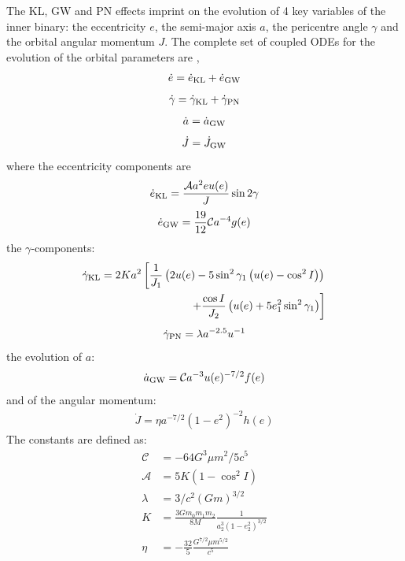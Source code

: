\documentclass[a4paper,fleqn,usenatbib]{mnras}
\begin{document}
\noindent The KL, GW and PN effects imprint on the evolution of 4 key variables of the inner binary: the eccentricity $e$, the semi-major axis $a$, the pericentre angle $\gamma$ and the orbital angular momentum $J$. The complete set of coupled ODEs for the evolution of the orbital parameters are \citep{Randall2018},
\begin{eqnarray}
\dot{e} = \dot{e}_{\rm KL} + \dot{e}_{\rm GW}
\label{eq:edot}
\end{eqnarray}
\begin{eqnarray}
\dot{\gamma} = \dot{\gamma}_{\rm KL} + \dot{\gamma}_{\rm PN}
\label{eq:gdot}
\end{eqnarray}
\begin{eqnarray}
\dot{a} = \dot{a}_{\rm GW} 
\label{eq:gwdot}
\end{eqnarray}
\begin{eqnarray}
\dot{J} = \dot{J}_{\rm GW} 
\label{eq:Jdot}
\end{eqnarray}
where the eccentricity components are
\begin{eqnarray}
\dot{e}_{\rm KL} =   \frac{\mathcal{A} a^2 e u(e)}{J}  \sin 2 \gamma
\end{eqnarray}
\begin{eqnarray}
\dot{e}_{\rm GW} = \frac{19}{12} \mathcal{C} a^{-4} g(e)
\end{eqnarray}
the $\gamma$-components:
\begin{align}
\dot{\gamma}_{\rm KL} = 2 Ka^2\left[\frac{1}{J_{1}}\left(2u(e)-5 \sin ^{2} \gamma_{1}\left(u(e)-\cos ^{2} I\right) \right)\right. \\
\left.+\frac{\cos I}{J_{2}}\left(u(e)+5 e_{1}^{2} \sin ^{2} \gamma_{1}\right) \right]
\end{align}
\begin{eqnarray}
\dot{\gamma}_{\rm PN} = \lambda a^{-2.5} u^{-1 }
\end{eqnarray}
the evolution of $a$:
\begin{eqnarray}
\dot{a}_{\rm GW} = \mathcal{C} a^{-3} u(e)^{-7/2} f(e)
\label{eq:adot_spec}
\end{eqnarray}
and of the angular momentum:
\begin{eqnarray}
\dot{J} = \eta a^{-7/2} (1-e^2)^{-2} h(e)
\end{eqnarray}
The constants are defined as:
\begin{align}
\mathcal{C} &= -64 G^{3} \mu m^{2} / 5c^5 \\
\mathcal{A} &= 5 K \left(1-\cos ^{2} I\right) \\
\lambda &= 3/c^2 (Gm)^{3/2} \\
K &= \frac{3 G m_{0} m_{1} m_{2}}{8 M} \frac{1}{a_{2}^{3}\left(1-e_{2}^{2}\right)^{3 / 2}} \\
\eta &= -\frac{32}{5} \frac{G^{7/2} \mu m^{5/2}}{c^5}
\end{align}
\end{document}
